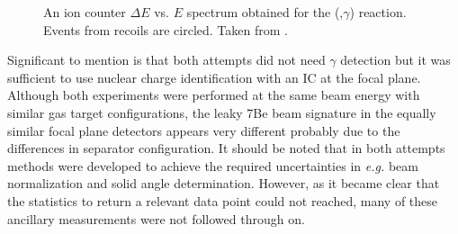 \begin{figure}
\begin{center}
\caption{An ion counter $\Delta{}E$ vs. $E$ spectrum obtained for the (,$\gamma$) reaction. Events from  recoils are circled. Taken from \cite{bard09}.}
\label{fig:bardayan09_fig4}
\end{center}
\end{figure}%
Significant to mention is that both attempts did not need $\gamma$ detection but it was sufficient to use nuclear charge identification with an IC at the focal plane. Although both experiments were performed at the same beam energy with similar gas target configurations, the leaky 7Be beam signature in the equally similar focal plane detectors appears very different probably due to the differences in separator configuration. It should be noted that in both attempts methods were developed to achieve the required uncertainties in {\it e.g.} beam normalization and solid angle determination. However, as it became clear that the statistics to return a relevant data point could not reached, many of these ancillary measurements were not followed through on. 


